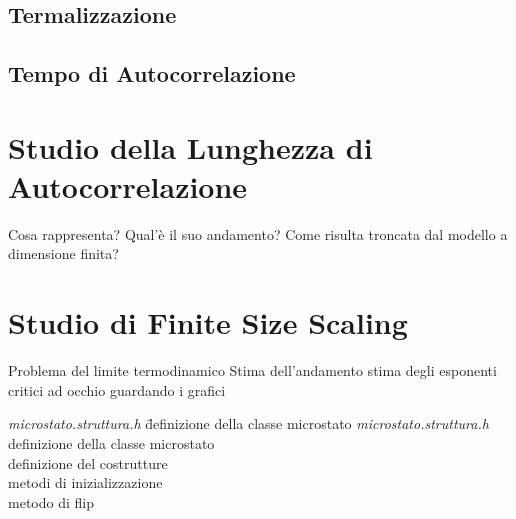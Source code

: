 \documentclass[11pt]{article}
\theoremstyle{plain}
\begin{document}
\subsection{Termalizzazione}

\subsection{Tempo di Autocorrelazione}

\section{Studio della Lunghezza di Autocorrelazione}\label{Parte C}
Cosa rappresenta?
Qual'è il suo andamento?
Come risulta troncata dal modello a dimensione finita?

\section{Studio di Finite Size Scaling}\label{Parte D}
Problema del limite termodinamico
Stima dell'andamento
stima degli esponenti critici ad occhio guardando i grafici

\newpage


		\begin{tabbing}
		\emph{microstato.struttura.h} \= definizione della classe microstato \kill
		\emph{microstato.struttura.h} \>\footnotesize definizione della classe microstato \\
		  \>\footnotesize  definizione del costrutture \\
		  \>\footnotesize metodi di inizializzazione  \\
		  \>\footnotesize metodo di flip \\
		\end{tabbing}





\end{document}
